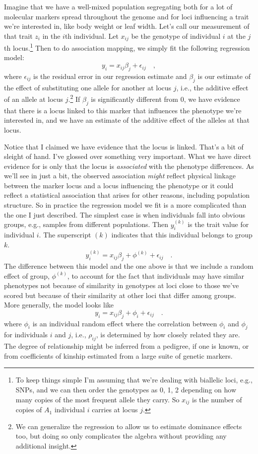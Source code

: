 \documentclass[12pt]{article}
\begin{document}
Imagine that we have a well-mixed population segregating both for a
lot of molecular markers spread throughout the genome and for loci
influencing a trait we're interested in, like body weight or leaf
width. Let's call our measurement of that trait $z_i$ in the $i$th
individual. Let $x_{ij}$ be the genotype of individual $i$ at the
$j$th locus.\footnote{To keep things simple I'm assuming that we're
  dealing with biallelic loci, e.g., SNPs, and we can then order the
  genotypes as 0, 1, 2 depending on how many copies of the most
  frequent allele they carry. So $x_{ij}$ is the number of copies of
  $A_1$ individual $i$ carries at locus $j$.} Then to do association
mapping, we simply fit the following regression model:
\[
y_i = x_{ij}\beta_j + \epsilon_{ij} \quad ,
\]
where $\epsilon_{ij}$ is the residual error in our regression estimate
and $\beta_j$ is our estimate of the effect of substituting one allele
for another at locus $j$, i.e., the additive effect of an allele at
locus $j$.\footnote{We can generalize the regression to allow us to
  estimate dominance effects too, but doing so only complicates the
  algebra without providing any additional insight.} If $\beta_j$ is
significantly different from 0, we have evidence that there is a locus
linked to this marker that influences the phenotype we're interested
in, and we have an estimate of the additive effect of the alleles at
that locus.

Notice that I claimed we have evidence that the locus is
linked. That's a bit of sleight of hand. I've glossed over something
very important. What we have direct evidence for is only that the
locus is {\it associated} with the phenotype differences. As we'll see
in just a bit, the observed association {\it might\/} reflect physical
linkage between the marker locus and a locus influencing the phenotype
or it could reflect a statistical association that arises for other
reasons, including population structure. So in practice the regression
model we fit is a more complicated than the one I just described. The
simplest case is when individuals fall into obvious groups, e.g.,
samples from different populations. Then $y_i^{(k)}$ is the trait
value for individual $i$. The superscript $(k)$ indicates that this
individual belongs to group $k$.
\[
y_i^{(k)} = x_{ij}\beta_j + \phi^{(k)} + \epsilon_{ij} \quad .
\]
The difference between this model and the one above is that we include
a random effect of group, $\phi^{(k)}$, to account for the fact that
individuals may have similar phenotypes not because of similarity in
genotypes at loci close to those we've scored but because of their
similarity at other loci that differ among groups. More generally, the
model looks like
\[
y_i = x_{ij}\beta_j + \phi_i + \epsilon_{ij} \quad .
\]
where $\phi_i$ is an individual random effect where the correlation
between $\phi_i$ and $\phi_j$ for individuals $i$ and $j$, i.e.,
$\rho_{ij}$, is determined by how closely related they are. The degree
of relationship might be inferred from a pedigree, if one is known, or
from coefficients of kinship estimated from a large suite of genetic
markers.
\end{document}
